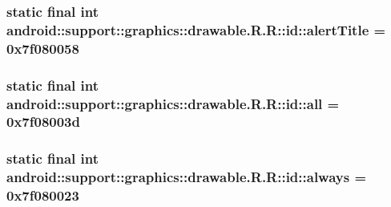 \hypertarget{classandroid_1_1support_1_1graphics_1_1drawable_1_1_r_1_1id_9364902c9303b4b5967b8d323fe1cb47}{
\subsubsection[{alertTitle}]{\setlength{\rightskip}{0pt plus 5cm}static final int android::support::graphics::drawable.R.R::id::alertTitle = 0x7f080058}}
\label{classandroid_1_1support_1_1graphics_1_1drawable_1_1_r_1_1id_9364902c9303b4b5967b8d323fe1cb47}


\hypertarget{classandroid_1_1support_1_1graphics_1_1drawable_1_1_r_1_1id_d5d155158603ec8ff32a81f95b46c6c5}{
\subsubsection[{all}]{\setlength{\rightskip}{0pt plus 5cm}static final int android::support::graphics::drawable.R.R::id::all = 0x7f08003d}}
\label{classandroid_1_1support_1_1graphics_1_1drawable_1_1_r_1_1id_d5d155158603ec8ff32a81f95b46c6c5}


\hypertarget{classandroid_1_1support_1_1graphics_1_1drawable_1_1_r_1_1id_799b76aa023cf2fe080956d6e1e6a72d}{
\subsubsection[{always}]{\setlength{\rightskip}{0pt plus 5cm}static final int android::support::graphics::drawable.R.R::id::always = 0x7f080023}}
\label{classandroid_1_1support_1_1graphics_1_1drawable_1_1_r_1_1id_799b76aa023cf2fe080956d6e1e6a72d}


